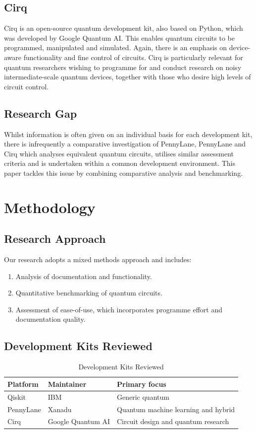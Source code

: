 \documentclass[journal]{IEEEtran}
\begin{document}
\subsection{Cirq}
Cirq is an open-source quantum development kit, also based on Python, which was developed by Google Quantum AI. This enables quantum circuits to be programmed, manipulated and simulated. Again, there is an emphasis on device-aware functionality and fine control of circuits. Cirq is particularly relevant for quantum researchers wishing to programme for and conduct research on noisy intermediate-scale quantum devices, together with those who desire high levels of circuit control.

\subsection{Research Gap}
Whilst information is often given on an individual basis for each development kit, there is infrequently a comparative investigation of PennyLane, PennyLane and Cirq which analyses equivalent quantum circuits, utilises similar assessment criteria and is undertaken within a common development environment. This paper tackles this issue by combining comparative analysis and benchmarking.

\section{Methodology}

\subsection{Research Approach}
Our research adopts a mixed methods approach and includes:
\begin{enumerate}
\item Analysis of documentation and functionality.
\item Quantitative benchmarking of quantum circuits.
\item Assessment of ease-of-use, which incorporates programme effort and documentation quality.
\end{enumerate}

\subsection{Development Kits Reviewed}
\begin{table}[!t]
\caption{Development Kits Reviewed}
\label{tab:kits}
\centering
\small
\begin{tabularx}{\columnwidth}{l l Y}
\toprule
\textbf{Platform} & \textbf{Maintainer} & \textbf{Primary focus}\\
\midrule
Qiskit & IBM & Generic quantum\\
PennyLane & Xanadu & Quantum machine learning and hybrid\\
Cirq & Google Quantum AI & Circuit design and quantum research\\
\bottomrule
\end{tabularx}
\end{table}
\end{document}
